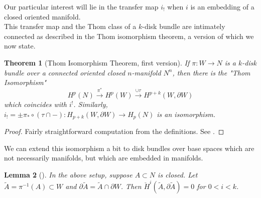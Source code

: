 \documentclass[reqno]{amsart}
\newtheorem{theorem}{Theorem}[section]
\newtheorem{lemma}[theorem]{Lemma}
\theoremstyle{definition}
\theoremstyle{remark}
\begin{document}
Our particular interest will lie in 
the transfer map $i_!$ when $i$ is an embedding
of a closed oriented manifold.\\
\linebreak
This transfer map and the Thom class of a $k$-disk bundle are
intimately connected as described in the Thom isomorphism theorem, a
version of which we now state.

\begin{theorem}[Thom Isomorphism Theorem, first version]
    If $\pi \colon W \to N$ is a $k$-disk bundle
    over a connected oriented closed $n$-manifold $N^{n}$, then
    there is the "Thom Isomorphism"
    \[
    H^{p}(N) \stackrel{\pi^{*}}{\to} H^{p}(W)
    \stackrel{\cup \tau}{\to} H^{p+k}(W, \partial W)
    \] 
    which coincides with $i^{!}$. Similarly,
    $i_! = \pm \pi_* \circ \left( \tau \cap - \right) \colon
    H_{p+k}\left( W, \partial W \right) \to 
    H_p (N)$ is an isomorphism.
\end{theorem}

\begin{proof}
    Fairly straightforward computation from the definitions. 
    See \cite{Bredon}.
\end{proof}

We can extend this isomorphism a bit to
disk bundles over base spaces which are not necessarily manifolds,
but which are embedded in manifolds.






\begin{lemma}[]
    In the above setup, suppose
    $A \subset N$ is closed. Let
    $\tilde{A} = \pi^{-1}(A) \subset W$ and
    $\partial \tilde{A} = \tilde{A} \cap \partial W$.
    Then
    $\check{H}^{i}\left( \tilde{A},
    \partial \tilde{A} \right) = 0$ for 
    $0<i < k$.
\end{lemma}
\end{document}

